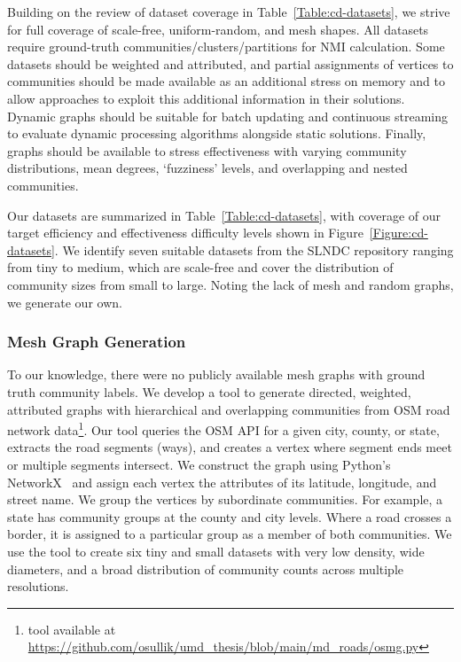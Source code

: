 Building on the review of dataset coverage in  Table~\ref{Table:cd-datasets}, we strive for full coverage of scale-free, uniform-random, and mesh shapes.
All datasets require ground-truth communities/clusters/partitions for \ac{NMI} calculation.
Some datasets should be weighted and attributed, and partial assignments of vertices to communities should be made available as an additional stress on memory and to allow approaches to exploit this additional information in their solutions. 
Dynamic graphs should be suitable for batch updating and continuous streaming to evaluate dynamic processing algorithms alongside static solutions.
Finally, graphs should be available to stress effectiveness with varying community distributions, mean degrees, `fuzziness' levels, and overlapping and nested communities.

Our datasets are summarized in Table~\ref{Table:cd-datasets}, with coverage of our target efficiency and effectiveness difficulty levels shown in Figure~\ref{Figure:cd-datasets}.
We identify seven suitable datasets from the \ac{SLNDC} repository ranging from tiny to medium, which are scale-free and cover the distribution of community sizes from small to large. 
Noting the lack of mesh and random graphs, we generate our own.

\subsubsection{Mesh Graph Generation}
To our knowledge, there were no publicly available mesh graphs with ground truth community labels. 
We develop a tool to generate directed, weighted, attributed graphs with hierarchical and overlapping communities from \ac{OSM} road network data\footnote{\scriptsize tool available at \url{https://github.com/osullik/umd_thesis/blob/main/md_roads/osmg.py}}. 
Our tool queries the \ac{OSM} \ac{API} for a given city, county, or state, extracts the road segments (ways), and creates a vertex where segment ends meet or multiple segments intersect. 
We construct the graph using Python's NetworkX~\cite{Hagberg2008} and assign each vertex the attributes of its latitude, longitude, and street name. 
We group the vertices by subordinate communities. 
For example, a state has community groups at the county and city levels.
Where a road crosses a border, it is assigned to a particular group as a member of both communities. 
We use the tool to create six tiny and small datasets with very low density, wide diameters, and a broad distribution of community counts across multiple resolutions. 

